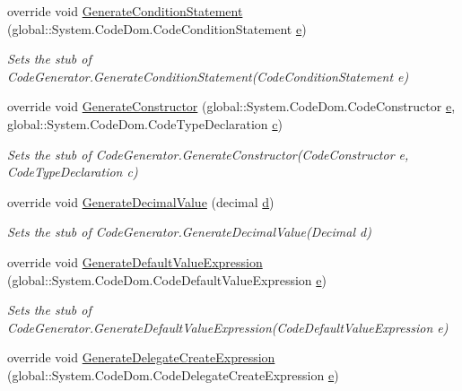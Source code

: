 \begin{DoxyCompactItemize}
override void \hyperlink{class_system_1_1_code_dom_1_1_compiler_1_1_fakes_1_1_stub_code_compiler_a5dcf2131a5244056179d87a794b9b027}{Generate\-Condition\-Statement} (global\-::\-System.\-Code\-Dom.\-Code\-Condition\-Statement \hyperlink{jquery-1_810_82_8min_8js_a2c038346d47955cbe2cb91e338edd7e1}{e})
\begin{DoxyCompactList}\small\item\em Sets the stub of Code\-Generator.\-Generate\-Condition\-Statement(\-Code\-Condition\-Statement e)\end{DoxyCompactList}\item 
override void \hyperlink{class_system_1_1_code_dom_1_1_compiler_1_1_fakes_1_1_stub_code_compiler_a263d2d91798c6a1ef38373da4ce9dc80}{Generate\-Constructor} (global\-::\-System.\-Code\-Dom.\-Code\-Constructor \hyperlink{jquery-1_810_82_8min_8js_a2c038346d47955cbe2cb91e338edd7e1}{e}, global\-::\-System.\-Code\-Dom.\-Code\-Type\-Declaration \hyperlink{bootstrap_8min_8js_abce695e0af988ece0826d9ad59b8160d}{c})
\begin{DoxyCompactList}\small\item\em Sets the stub of Code\-Generator.\-Generate\-Constructor(\-Code\-Constructor e, Code\-Type\-Declaration c)\end{DoxyCompactList}\item 
override void \hyperlink{class_system_1_1_code_dom_1_1_compiler_1_1_fakes_1_1_stub_code_compiler_a4cb90a654204a0b42f0d2e39ffaeccc2}{Generate\-Decimal\-Value} (decimal \hyperlink{bootstrap_8min_8js_aeb337d295abaddb5ec3cb34cc2e2bbc9}{d})
\begin{DoxyCompactList}\small\item\em Sets the stub of Code\-Generator.\-Generate\-Decimal\-Value(\-Decimal d)\end{DoxyCompactList}\item 
override void \hyperlink{class_system_1_1_code_dom_1_1_compiler_1_1_fakes_1_1_stub_code_compiler_a2d1db2ab570883fefc2a06b4ed4b6214}{Generate\-Default\-Value\-Expression} (global\-::\-System.\-Code\-Dom.\-Code\-Default\-Value\-Expression \hyperlink{jquery-1_810_82_8min_8js_a2c038346d47955cbe2cb91e338edd7e1}{e})
\begin{DoxyCompactList}\small\item\em Sets the stub of Code\-Generator.\-Generate\-Default\-Value\-Expression(\-Code\-Default\-Value\-Expression e)\end{DoxyCompactList}\item 
override void \hyperlink{class_system_1_1_code_dom_1_1_compiler_1_1_fakes_1_1_stub_code_compiler_ab3272cdcec46bf7dae612e70da725f47}{Generate\-Delegate\-Create\-Expression} (global\-::\-System.\-Code\-Dom.\-Code\-Delegate\-Create\-Expression \hyperlink{jquery-1_810_82_8min_8js_a2c038346d47955cbe2cb91e338edd7e1}{e})

\end{DoxyCompactItemize}
